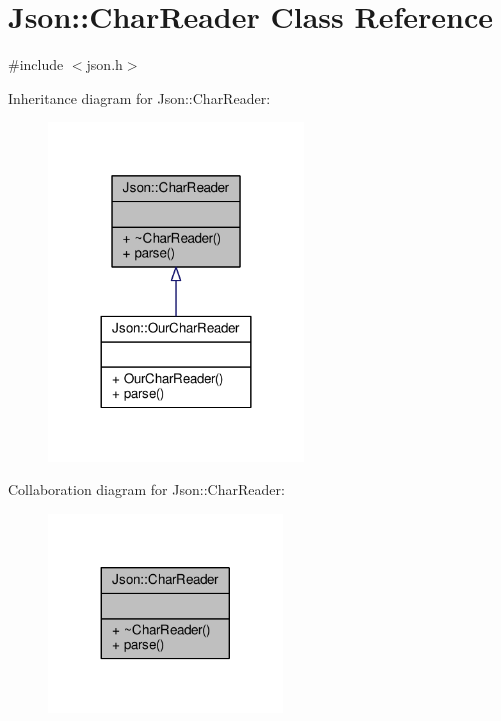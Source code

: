 \hypertarget{classJson_1_1CharReader}{}\section{Json\+:\+:Char\+Reader Class Reference}
\label{classJson_1_1CharReader}


{\ttfamily \#include $<$json.\+h$>$}



Inheritance diagram for Json\+:\+:Char\+Reader\+:
\nopagebreak
\begin{figure}[H]
\begin{center}
\leavevmode
\includegraphics[width=192pt]{d6/d8f/classJson_1_1CharReader__inherit__graph}
\end{center}
\end{figure}


Collaboration diagram for Json\+:\+:Char\+Reader\+:
\nopagebreak
\begin{figure}[H]
\begin{center}
\leavevmode
\includegraphics[width=176pt]{d5/d3f/classJson_1_1CharReader__coll__graph}
\end{center}
\end{figure}
